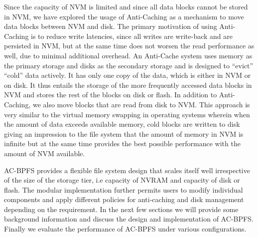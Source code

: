 Since the capacity of NVM is limited and since all data blocks cannot be stored in NVM, we have explored the usage of Anti-Caching \cite{c13} as a mechanism to move data blocks between NVM and disk. The primary motivation of using Anti-Caching is to reduce write latencies, since all writes are write-back and are persisted in NVM, but at the same time does not worsen the read performance as well, due to minimal additional overhead. An Anti-Cache system uses memory as the primary storage and disks as the secondary storage and is designed to “evict” “cold” data actively. It has only one copy of the data, which is either in NVM or on disk. It thus entails the storage of the more frequently accessed data blocks in NVM and stores the rest of the blocks on disk or flash. In addition to Anti-Caching, we also move blocks that are read from disk to NVM. This approach is very similar to the virtual memory swapping in operating systems wherein when the amount of data exceeds available memory, cold blocks are written to disk giving an impression to the file system that the amount of memory in NVM is infinite but at the same time provides the best possible performance with the amount of NVM available.

AC-BPFS provides a flexible file system design that scales itself well irrespective of the size of the storage tier, i.e capacity of NVRAM and capacity of disk or flash. The modular implementation further permits users to modify individual components and apply different policies for anti-caching and disk management depending on the requirement. In the next few sections we will provide some background information and discuss the design and implementation of AC-BPFS. Finally we evaluate the performance of AC-BPFS under various configurations.   


 
